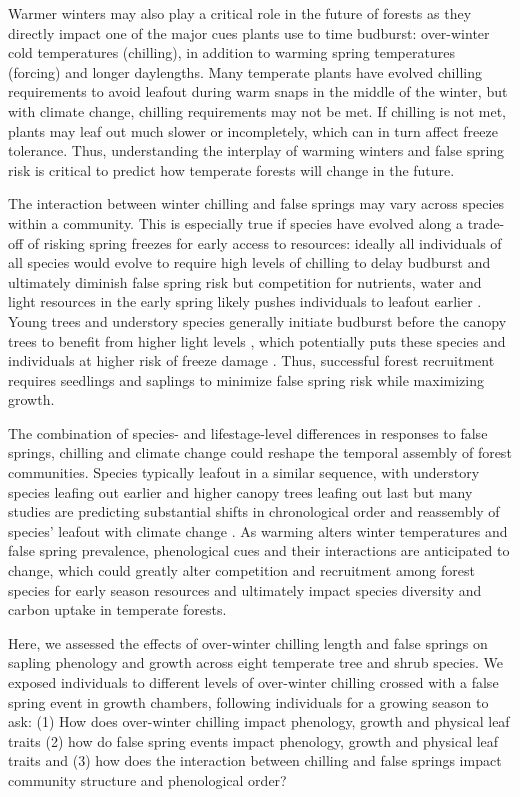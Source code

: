 \documentclass{article}\usepackage[]{graphicx}\usepackage[]{color}
\begin{document}
Warmer winters may also play a critical role in the future of forests as they directly impact one of the  major cues plants use to time budburst: over-winter cold temperatures (chilling), in addition to warming spring temperatures (forcing) and longer daylengths. Many temperate plants have evolved chilling requirements to avoid leafout during warm snaps in the middle of the winter, but with climate change, chilling requirements may not be met. If chilling is not met, plants may leaf out much slower or incompletely, which can in turn affect freeze tolerance. Thus, understanding the interplay of warming winters and false spring risk is critical to predict how temperate forests will change in the future.
  
The interaction between winter chilling and false springs may vary across species within a community. This is especially true if species have evolved along a trade-off of risking spring freezes for early access to resources: ideally all individuals of all species would evolve to require high levels of chilling to delay budburst and ultimately diminish false spring risk but competition for nutrients, water and light resources in the early spring likely pushes individuals to leafout earlier \citep{Augspurger2013}. Young trees and understory species generally initiate budburst before the canopy trees to benefit from higher light levels \citep {Augspurger2008, Vitasse2013}, which potentially puts these species and individuals at higher risk of freeze damage \citep{Vitasse2014}. Thus, successful forest recruitment requires seedlings and saplings to minimize false spring risk while maximizing growth. 
 
The combination of species- and lifestage-level differences in responses to false springs, chilling and climate change could reshape the temporal assembly of forest communities. Species typically leafout in a similar sequence, with understory species leafing out earlier and higher canopy trees leafing out last but many studies are predicting substantial shifts in chronological order and reassembly of species' leafout with climate change \citep{Roberts2015, Laube2014}. As warming alters winter temperatures and false spring prevalence, phenological cues and their interactions are anticipated to change, which could greatly alter competition and recruitment among forest species for early season resources and ultimately impact species diversity and carbon uptake in temperate forests.
  
Here, we assessed the effects of over-winter chilling length and false springs on sapling phenology and growth across eight temperate tree and shrub species. We exposed individuals to different levels of over-winter chilling crossed with a false spring event in growth chambers, following individuals for a growing season to ask: (1) How does over-winter chilling impact phenology, growth and physical leaf traits (2) how do false spring events impact phenology, growth and physical leaf traits and (3) how does the interaction between chilling and false springs impact community structure and phenological order?
\end{document}
